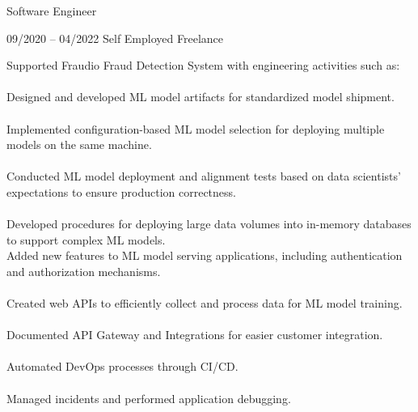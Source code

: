 \documentclass[9pt, green]{template/developercv} %
\begin{document}
{\begin{entrylist}
{		
	}
	{Software Engineer}

	\entry
	{09/2020 -- 04/2022 }
	{}
	{Self Employed \space\cpipe\space Freelance}
	{
		\vspace{0.3mm}
		\begin{minipage}[t]{0.75\textwidth}
			\vspace{-\baselineskip}
            Supported Fraudio Fraud Detection System with engineering activities such as:\\
            \vspace{-3mm}\\
            \itemmarker Designed and developed ML model artifacts for standardized model shipment.\\
            \vspace{-3mm}\\
            \itemmarker Implemented configuration-based ML model selection for deploying multiple models on the same machine.\\
            \vspace{-3mm}\\
            \itemmarker Conducted ML model deployment and alignment tests based on data scientists' expectations to ensure production correctness.\\
            \vspace{-3mm}\\
            \itemmarker Developed procedures for deploying large data volumes into in-memory databases to support complex ML models.\\
            \itemmarker Added new features to ML model serving applications, including authentication and authorization mechanisms.\\
            \vspace{-3mm}\\
            \itemmarker Created web APIs to efficiently collect and process data for ML model training.\\
            \vspace{-3mm}\\
            \itemmarker Documented API Gateway and Integrations for easier customer integration.\\
            \vspace{-3mm}\\
            \itemmarker Automated DevOps processes through CI/CD.\\
            \vspace{-3mm}\\
            \itemmarker Managed incidents and performed application debugging.\\
            \vspace{-3mm}\\
		\end{minipage}

}
\end{entrylist}}
\end{document}
